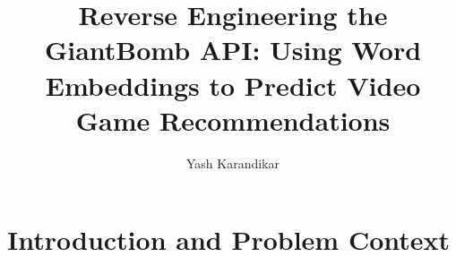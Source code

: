 \documentclass[10pt,twocolumn]{article}
\title{Reverse Engineering the GiantBomb API: Using Word Embeddings to Predict Video Game Recommendations}
\author{Yash Karandikar}
\affiliation{Occidental College}
\begin{document}
\maketitle
 
\section{Introduction and Problem Context}



        

\end{document}
